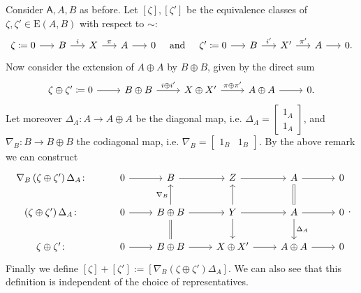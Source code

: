 \begin{defn}
	Consider $\mathsf{A},A,B$ as before.
	Let $\left[ \zeta \right], \left[ \zeta' \right]$ be the equivalence classes
	of $\zeta,\zeta' \in \mathrm{E}(A,B)$
	with respect to $\sim$:
	\begin{equation*}
	\begin{tikzcd}[column sep=1.5em]
		\zeta \coloneqq 0 \arrow[r, "", rightarrow] &
		B \arrow[r, "i", rightarrow] &
		X \arrow[r, "\pi", rightarrow] &
		A \arrow[r, "", rightarrow] &
		0
	\end{tikzcd}
	\quad\text{and}\quad
	\begin{tikzcd}[column sep=1.5em]
		\zeta' \coloneqq 0 \arrow[r, "", rightarrow] &
		B \arrow[r, "i'", rightarrow] &
		X' \arrow[r, "\pi'", rightarrow] &
		A \arrow[r, "", rightarrow] &
		0
	.\end{tikzcd}
	\end{equation*}
	Now consider the extension of $A \oplus A$ by $B \oplus B$, given by the direct sum
	\begin{equation*}
	\begin{tikzcd}
		\zeta \oplus \zeta'\coloneqq 
		0 \arrow[r, "", rightarrow] &
		B \oplus B \arrow[r, "i \oplus i'", rightarrow] &
		X \oplus X' \arrow[r, "\pi \oplus \pi'", rightarrow] &
		A \oplus A \arrow[r, "", rightarrow] &
		0
	.\end{tikzcd}
	\end{equation*}
	Let moreover $\Delta_A\colon A \to A \oplus A$ be the diagonal map,
	i.e. $\Delta_A = \begin{bmatrix} 1_A \\ 1_A \end{bmatrix}$,
	and $\nabla_B\colon B \to B \oplus B$ the codiagonal map,
	i.e. $\nabla_B = \begin{bmatrix} 1_B & 1_B \end{bmatrix}$.
	By the above remark we can construct
	\begin{equation*}
	\begin{tikzcd}
		\nabla_B \left( \zeta \oplus \zeta' \right) \Delta_A\colon &
		0 \arrow[r, "", rightarrow] &
		B \arrow[r, "", rightarrow] &
		Z \arrow[r, "", rightarrow] &
		A \arrow[r, "", rightarrow] \arrow[d, "", equal] &
		0\\
		\left( \zeta \oplus \zeta' \right) \Delta_A \colon &
		0 \arrow[r, "", rightarrow] &
		B \oplus B \arrow[r, "", rightarrow] \arrow[d, "", equal] \arrow[u, "\nabla_B", rightarrow] &
		Y \arrow[r, "", rightarrow] \arrow[d, "", rightarrow] \arrow[u, "", rightarrow] &
		A \arrow[r, "", rightarrow] \arrow[d, "\Delta_A", rightarrow] &
		0\\
		\zeta \oplus \zeta' \colon &
		0 \arrow[r, "", rightarrow] &
		B \oplus B \arrow[r, "", rightarrow] &
		X \oplus X' \arrow[r, "", rightarrow] &
		A \oplus A \arrow[r, "", rightarrow] &
		0
	\end{tikzcd}
	.\end{equation*} 
	Finally we define $\left[ \zeta \right] + \left[ \zeta' \right] :=
	\left[ \nabla_B \left( \zeta \oplus \zeta' \right)\Delta_A \right]$.
	We can also see that this definition is independent of the choice
	of representatives.
\end{defn}

